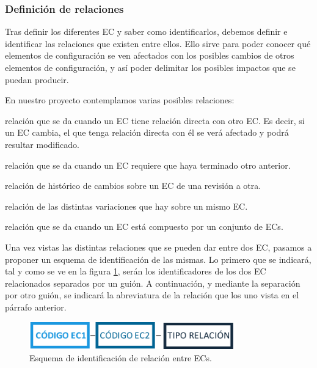 \subsubsection{Definición de relaciones}
\par Tras definir los diferentes EC y saber como identificarlos, debemos definir e identificar las relaciones que existen entre ellos. Ello sirve para poder conocer qué elementos de configuración se ven afectados con los posibles cambios de otros elementos de configuración, y así poder delimitar los posibles impactos que se puedan producir.
\par En nuestro proyecto contemplamos varias posibles relaciones:

\begin{description}[style=multiline, leftmargin=4cm]
  \item[\textbf{Dependencia (DEP):}] relación que se da cuando un EC tiene relación directa con otro EC. Es decir, si un EC cambia, el que tenga relación directa con él se verá afectado y podrá resultar modificado.
  \item[\textbf{Derivación (DER):}] relación que se da cuando un EC requiere que haya terminado otro anterior.
  \item[\textbf{Sucesión (SUC):}] relación de histórico de cambios sobre un EC de una revisión a otra.
  \item[\textbf{Variante (VAR):}] relación de las distintas variaciones que hay sobre un mismo EC.
  \item[\textbf{Composición (COMP):}] relación que se da cuando un EC está compuesto por un conjunto de ECs.
\end{description}

\par Una vez vistas las distintas relaciones que se pueden dar entre dos EC, pasamos a proponer un esquema de identificación de las mismas. Lo primero que se indicará, tal y como se ve en la figura \ref{img:relEC}, serán los identificadores de los dos EC relacionados separados por un guión. A continuación, y mediante la separación por otro guión, se indicará la abreviatura de la relación que los uno vista en el párrafo anterior.

\begin{figure}[hb]
\begin{center}
\includegraphics[width=0.8\textwidth]{./img/relEC}
\end{center}
\caption{Esquema de identificación de relación entre ECs.}
\label{img:relEC}
\end{figure}

